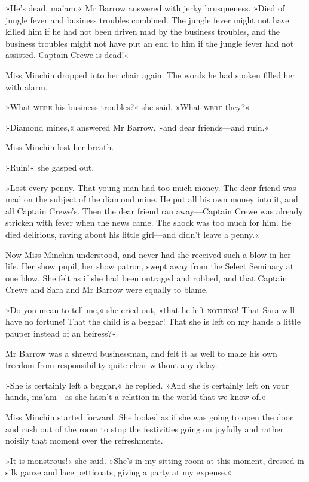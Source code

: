 »He's dead, ma'am,« Mr Barrow answered with jerky brusqueness. »Died of jungle fever and business troubles combined. The jungle fever might not have killed him if he had not been driven mad by the business troubles, and the business troubles might not have put an end to him if the jungle fever had not assisted. Captain Crewe is dead!«

Miss Minchin dropped into her chair again. The words he had spoken filled her with alarm.

»What \textsc{were} his business troubles?« she said. »What \textsc{were} they?«

»Diamond mines,« answered Mr Barrow, »and dear friends—and ruin.«

Miss Minchin lost her breath.

»Ruin!« she gasped out.

»Lost every penny. That young man had too much money. The dear friend was mad on the subject of the diamond mine. He put all his own money into it, and all Captain Crewe's. Then the dear friend ran away—Captain Crewe was already stricken with fever when the news came. The shock was too much for him. He died delirious, raving about his little girl—and didn't leave a penny.«

Now Miss Minchin understood, and never had she received such a blow in her life. Her show pupil, her show patron, swept away from the Select Seminary at one blow. She felt as if she had been outraged and robbed, and that Captain Crewe and Sara and Mr Barrow were equally to blame.

»Do you mean to tell me,« she cried out, »that he left \textsc{nothing}! That Sara will have no fortune! That the child is a beggar! That she is left on my hands a little pauper instead of an heiress?«

Mr Barrow was a shrewd businessman, and felt it as well to make his own freedom from responsibility quite clear without any delay.

»She is certainly left a beggar,« he replied. »And she is certainly left on your hands, ma'am—as she hasn't a relation in the world that we know of.«

Miss Minchin started forward. She looked as if she was going to open the door and rush out of the room to stop the festivities going on joyfully and rather noisily that moment over the refreshments.

»It is monstrous!« she said. »She's in my sitting room at this moment, dressed in silk gauze and lace petticoats, giving a party at my expense.«


